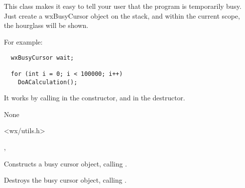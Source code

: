 \section{}\label{wxbusycursor}

This class makes it easy to tell your user that the program is temporarily busy.
Just create a wxBusyCursor object on the stack, and within the current scope,
the hourglass will be shown.

For example:

\begin{verbatim}
  wxBusyCursor wait;

  for (int i = 0; i < 100000; i++)
    DoACalculation();
\end{verbatim}

It works by calling  in the constructor,
and  in the destructor.


None


<wx/utils.h>


, 




Constructs a busy cursor object, calling .



Destroys the busy cursor object, calling .


